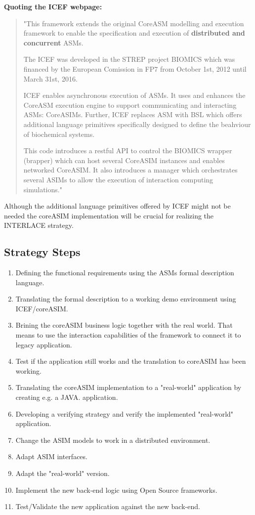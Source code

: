 \textbf{Quoting the ICEF webpage:}
\begin{quote}
"This framework extends the original CoreASM modelling and execution framework to enable the specification and execution of \textbf{distributed and concurrent} ASMs.

The ICEF was developed in the STREP project BIOMICS which was financed by the European Comission in FP7 from October 1st, 2012 until March 31st, 2016.

ICEF enables asynchronous execution of ASMs. It uses and enhances the CoreASM execution engine to support communicating and interacting ASMs: CoreASIMs. Further, ICEF replaces ASM with BSL which offers additional language primitives specifically designed to define the beahviour of biochemical systems.

This code introduces a restful API to control the BIOMICS wrapper (brapper) which can host several CoreASIM instances and enables networked CoreASIM. It also introduces a manager which orchestrates several ASIMs to allow the execution of interaction computing simulations."
\end{quote}

Although the additional language primitives offered by ICEF might not be needed the coreASIM implementation will be crucial for realizing the INTERLACE strategy.

\subsection{Strategy Steps}\label{subsection-strategy-steps}

\begin{enumerate}

	\item Defining the functional requirements using the ASMs formal description language.
	\item Translating the formal description to a working demo environment using ICEF/coreASIM.
	\item Brining the coreASIM business logic together with the real world. That means to use the interaction capabilities of the framework to connect it to legacy application.
	\item Test if the application still works and the translation to coreASIM has been working.
	\item Translating the coreASIM implementation to a "real-world" application by creating e.g. a JAVA. application.
	\item Developing a verifying strategy and verify the implemented "real-world" application.
	\item Change the ASIM models to work in a distributed environment.
	\item Adapt ASIM interfaces.
	\item Adapt the "real-world" version.
	\item Implement the new back-end logic using Open Source frameworks.
	\item Test/Validate the new application against the new back-end.
 
\end{enumerate}
	
